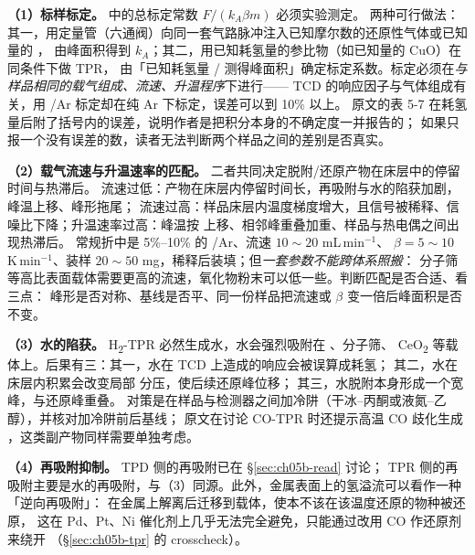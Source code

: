 \begin{measure}
\textbf{（1）标样标定。}  中的总标定常数 $F/(k_A\beta m)$ 必须实验测定。
两种可行做法：其一，用定量管（六通阀）向同一套气路脉冲注入已知摩尔数的还原性气体或已知量的 ，
由峰面积得到 $k_A$；其二，用已知耗氢量的参比物（如已知量的 CuO）在同条件下做 TPR，
由「已知耗氢量 / 测得峰面积」确定标定系数。标定必须在\emph{与样品相同的载气组成、流速、升温程序}下进行——
TCD 的响应因子与气体组成有关，用 /Ar 标定却在纯 Ar 下标定，误差可以到 10\% 以上。
原文的表 5-7 在耗氢量后附了括号内的误差，说明作者是把积分本身的不确定度一并报告的；
如果只报一个没有误差的数，读者无法判断两个样品之间的差别是否真实。

\textbf{（2）载气流速与升温速率的匹配。} 二者共同决定脱附/还原产物在床层中的停留时间与热滞后。
流速过低：产物在床层内停留时间长，再吸附与水的陷获加剧，峰温上移、峰形拖尾；
流速过高：样品床层内温度梯度增大，且信号被稀释、信噪比下降；升温速率过高：峰温按
 上移、相邻峰重叠加重、样品与热电偶之间出现热滞后。
常规折中是 5\%--10\% 的 /Ar、流速 $10\sim20$ mL\,min$^{-1}$、
$\beta=5\sim10$ K\,min$^{-1}$、装样 $20\sim50$ mg，稀释后装填；但\emph{一套参数不能跨体系照搬}：
分子筛等高比表面载体需要更高的流速，氧化物粉末可以低一些。判断匹配是否合适、看三点：
峰形是否对称、基线是否平、同一份样品把流速或 $\beta$ 变一倍后峰面积是否不变。

\textbf{（3）水的陷获。} H\textsubscript{2}-TPR 必然生成水，水会强烈吸附在 、分子筛、
CeO\textsubscript{2} 等载体上。后果有三：其一，水在 TCD 上造成的响应会被误算成耗氢；
其二，水在床层内积累会改变局部  分压，使后续还原峰位移；
其三，水脱附本身形成一个宽峰，与还原峰重叠。
对策是在样品与检测器之间加冷阱（干冰--丙酮或液氮--乙醇），并核对加冷阱前后基线；
原文在讨论 CO-TPR 时还提示高温 CO 歧化生成 ，这类副产物同样需要单独考虑。

\textbf{（4）再吸附抑制。} TPD 侧的再吸附已在 \S\ref{sec:ch05b-read} 讨论；
TPR 侧的再吸附主要是水的再吸附，与（3）同源。此外，金属表面上的氢溢流可以看作一种「逆向再吸附」：
 在金属上解离后迁移到载体，使本不该在该温度还原的物种被还原，
这在 Pd、Pt、Ni 催化剂上几乎无法完全避免，只能通过改用 CO 作还原剂来绕开
（\S\ref{sec:ch05b-tpr} 的 crosscheck）。
\end{measure}

